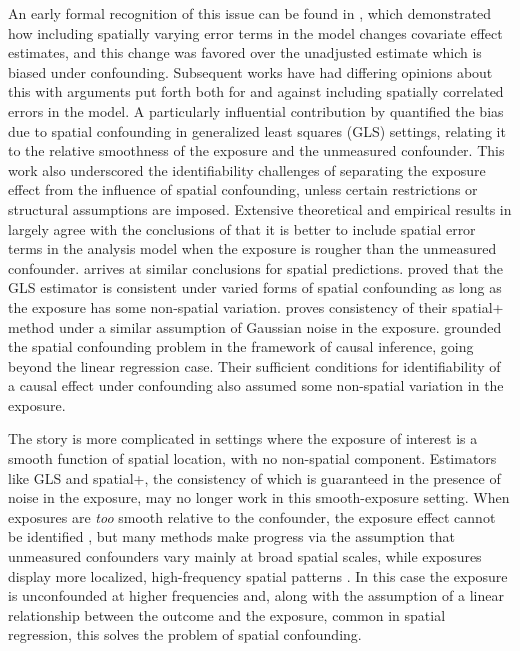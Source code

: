 \documentclass[
  12pt]{article}
\begin{document}
An early formal recognition of this issue can be found in \cite{clayton1993spatial}, which demonstrated how including spatially varying error terms in the model changes covariate effect estimates, and this change was favored over the unadjusted estimate which is biased under confounding. Subsequent works have had differing opinions about this \citep{woodard1999estimating,reich2006effects,wakefield2007disease,hodges2010adding,schnell2020mitigating,khan2022restricted,zimmerman2022deconfounding} with arguments put forth both for and against including spatially correlated errors in the model. A particularly influential contribution by \cite{paciorek2010importance} quantified the bias due to spatial confounding in generalized least squares (GLS) settings, relating it to the relative smoothness of the exposure and the unmeasured confounder. This work also underscored the identifiability challenges of separating the exposure effect from the influence of spatial confounding, unless certain restrictions or structural assumptions are imposed. Extensive theoretical and empirical results in \cite{khan2023re} largely agree with the conclusions of \cite{paciorek2010importance} that it is better to include spatial error terms in the analysis model when the exposure is rougher than the unmeasured confounder. \cite{page2017estimation} arrives at similar conclusions for spatial predictions. 
\cite{gilbert2025consistency} proved that the GLS estimator is consistent under varied forms of spatial confounding as long as the exposure has some non-spatial variation. \cite{dupont2022spatial+} proves consistency of their spatial+ method under a similar assumption of Gaussian noise in the exposure. \cite{gilbert2021causal} grounded the spatial confounding problem in the framework of causal inference, going beyond the linear regression case. Their sufficient conditions for identifiability of a causal effect under confounding also assumed some non-spatial variation in the exposure. 

The story is more complicated in settings where the exposure of interest is a smooth function of spatial location, with no non-spatial component.
Estimators like GLS and spatial+, the consistency of which is guaranteed in the presence of noise in the exposure, may no longer work in this smooth-exposure setting. When exposures are \textit{too} smooth relative to the confounder, the exposure effect cannot be identified \citep{bolin2025spatial,datta2025consistent}, but many  methods make progress via the assumption that unmeasured confounders vary mainly at broad spatial scales, while exposures display more localized, high-frequency spatial patterns \citep{thaden2018structural,keller2020selecting,dupont2022spatial+,dupont2023demystifying,guan2023spectral}. In this case the exposure is unconfounded at higher frequencies and, along with the assumption of a linear relationship between the outcome and the exposure, common in spatial regression, this solves the problem of spatial confounding. 
\end{document}
